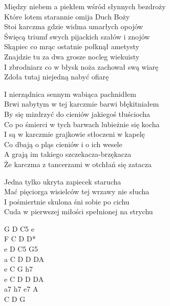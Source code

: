 \begin{text}

    Między niebem a piekłem wśród słynnych bezdroży\\
    Które lotem starannie omija Duch Boży\\
    Stoi karczma gdzie widma umarłych opojów\\
    Święcą triumf swych pijackich szałów i znojów\\
    Skąpiec co mrąc ostatnie połknął ametysty\\
    Znajdzie tu za dwa grosze nocleg wiekuisty\\
    I zbrodniarz co w błysk noża zachował swą wiarę\\
    Zdoła tutaj niejedną nabyć ofiarę

    I nierządnica sennym wabiąca pachnidłem\\
    Brwi nabytym w tej karczmie barwi błękitniałem\\
    By się mizdrzyć do cieniów jakiegoś tłuściocha\\
    Co po śmierci w tych barwach lubieżnie się kocha\\
    I są w karczmie grajkowie stłoczeni w kapelę\\
    Co dbają o pląs cieniów i o ich wesele\\
    A grają im takiego szczekacza-brzękacza\\
    Że karczma z tancerzami w otchłań się zatacza

    Jedna tylko ukryta zapiecek starucha\\
    Mać pięciorga wisielców tej wrzawy nie słucha\\
    I pośmiertnie skulona śni sobie po cichu\\
    Cuda w pierwszej miłości spełnionej na strychu
\end{text}
\begin{chord}
    \hfill\break
    \hfill\break
    \hfill\break
    G D C5 e\\
    F C D D*\\
    e D C5 G5\\
    a C D D DA\\
    e C G h7\\
    e C D D DA\\
    a7 h7 e7 A\\
    C D G
\end{chord}